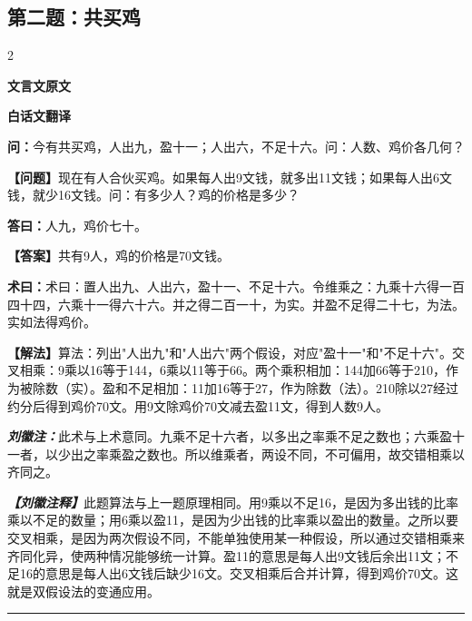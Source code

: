 \documentclass[10pt,a4paper]{article}
\newcommand{\wen}[1]{\textbf{\color{problemcolor}问：}#1\par}
\newcommand{\da}[1]{\textbf{答曰：}#1\par}
\newcommand{\shu}[1]{\textbf{术曰：}#1\par}
\newcommand{\liuhui}[1]{{\color{commentarycolor}\textit{\textbf{刘徽注：}}#1\par}}
\newcommand{\classicalheader}[1]{{\centering\large\bfseries\color{classicalcolor} #1\par\vspace{0.5em}}}
\newcommand{\wenmodern}[1]{\textbf{\color{moderncolor}【问题】}#1\par}
\newcommand{\damodern}[1]{\textbf{【答案】}#1\par}
\newcommand{\shumodern}[1]{\textbf{【解法】}#1\par}
\newcommand{\liuhuimodern}[1]{{\color{commentarycolor}\textit{\textbf{【刘徽注释】}}#1\par}}
\newcommand{\modernheader}[1]{{\centering\large\bfseries\color{moderncolor} #1\par\vspace{0.5em}}}
\newcommand{\problemsec}[1]{\subsection*{#1}}
\begin{document}
\problemsec{第二题：共买鸡}
\begin{paracol}{2}
\classicalheader{文言文原文}
\switchcolumn
\modernheader{白话文翻译}
\switchcolumn*

\wen{今有共买鸡，人出九，盈十一；人出六，不足十六。问：人数、鸡价各几何？}

\switchcolumn

\wenmodern{现在有人合伙买鸡。如果每人出9文钱，就多出11文钱；如果每人出6文钱，就少16文钱。问：有多少人？鸡的价格是多少？}

\switchcolumn*

\da{人九，鸡价七十。}

\switchcolumn

\damodern{共有9人，鸡的价格是70文钱。}

\switchcolumn*

\shu{术曰：置人出九、人出六，盈十一、不足十六。令维乘之：九乘十六得一百四十四，六乘十一得六十六。并之得二百一十，为实。并盈不足得二十七，为法。实如法得鸡价。}

\switchcolumn

\shumodern{算法：列出"人出九"和"人出六"两个假设，对应"盈十一"和"不足十六"。交叉相乘：9乘以16等于144，6乘以11等于66。两个乘积相加：144加66等于210，作为被除数（实）。盈和不足相加：11加16等于27，作为除数（法）。210除以27经过约分后得到鸡价70文。用9文除鸡价70文减去盈11文，得到人数9人。}

\switchcolumn*

\liuhui{此术与上术意同。九乘不足十六者，以多出之率乘不足之数也；六乘盈十一者，以少出之率乘盈之数也。所以维乘者，两设不同，不可偏用，故交错相乘以齐同之。}

\switchcolumn

\liuhuimodern{此题算法与上一题原理相同。用9乘以不足16，是因为多出钱的比率乘以不足的数量；用6乘以盈11，是因为少出钱的比率乘以盈出的数量。之所以要交叉相乘，是因为两次假设不同，不能单独使用某一种假设，所以通过交错相乘来齐同化异，使两种情况能够统一计算。盈11的意思是每人出9文钱后余出11文；不足16的意思是每人出6文钱后缺少16文。交叉相乘后合并计算，得到鸡价70文。这就是双假设法的变通应用。}

\end{paracol}

\vspace{0.3cm}
\hrule
\vspace{0.3cm}
\end{document}
